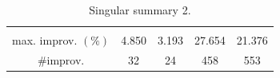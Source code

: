 \begin{table}[t]
	\begin{center}
		\begin{tabular}{|c|c|c|c|c|}
			\hline
			 \\
			\hline
			 & \IPMAPIns & \CXHIns & \ResetIns & \LPhaseIns \\
			\hline
			max. improv. $(\%)$ & 4.850 & 3.193 & 27.654 & 21.376 \\
			\hline
			\#improv. & 32 & 24 & 458 & 553 \\
			\hline
		\end{tabular}
	\end{center}
	\caption{Singular summary 2.}
	\label{tab:singular_summary2}
\end{table}